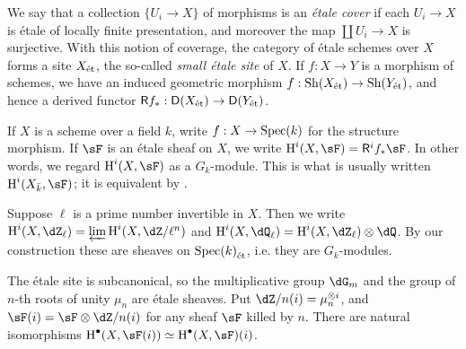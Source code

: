 \documentclass{article}
\begin{document}
We say that a collection $\{U_i\to X\}$ of morphisms is an \emph{\'etale 
cover} if each $U_i \to X$ is \'etale of locally finite presentation, and 
moreover the map $\coprod U_i \to X$ is surjective. With this notion of 
coverage, the category of \'etale schemes over $X$ forms a site 
${X}_\textnormal{\'et}$, the so-called \emph{small \'etale site} of $X$. If $f:X\to Y$ is a 
morphism of schemes, we have an induced geometric morphism 
$f:\operatorname{Sh}({X}_\textnormal{\'et}) \to \operatorname{Sh}({Y}_\textnormal{\'et})$, and hence a 
derived functor $\mathsf R f_\ast:\mathsf D({X}_\textnormal{\'et}) \to \mathsf D({Y}_\textnormal{\'et})$. 

If $X$ is a scheme over a field $k$, write $f:X\to \operatorname{Spec}(k)$ for the structure 
morphism. If $\sF$ is an \'etale sheaf on $X$, we write 
$\h^i(X,\sF) = \mathsf R^i f_\ast \sF$. In other words, we regard 
$\h^i(X,\sF)$ as a $G_k$-module. This is what is usually written 
$\h^i(X_{\bar k},\sF)$; it is equivalent by \cite[I 4.1.1]{de77}.

Suppose $\ell$ is a prime number invertible in $X$. Then we write 
$\h^i(X,\dZ_\ell) = \varprojlim \h^i(X,\dZ/\ell^n)$ and 
$\h^i(X,\dQ_\ell) = \h^i(X,\dZ_\ell)\otimes \dQ$. By our construction these 
are sheaves on ${\operatorname{Spec}(k)}_\textnormal{\'et}$, i.e. they are $G_k$-modules. 

The \'etale site is subcanonical, so the multiplicative group $\dG_m$ and the 
group of $n$-th roots of unity $\mu_n$ are \'etale sheaves. Put 
$\dZ/n(i) = \mu_n^{\otimes i}$, and $\sF(i) = \sF\otimes \dZ/n(i)$ for any 
sheaf $\sF$ killed by $n$. There are natural isomorphisms 
$\h^\bullet(X,\sF(i)) \simeq \h^\bullet(X,\sF)(i)$. 












\end{document}

